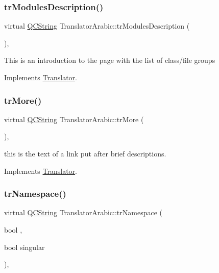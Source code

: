 \subsubsection{\texorpdfstring{trModulesDescription()}{trModulesDescription()}}
{\footnotesize\ttfamily virtual \mbox{\hyperlink{class_q_c_string}{Q\+C\+String}} Translator\+Arabic\+::tr\+Modules\+Description (\begin{DoxyParamCaption}{ }\end{DoxyParamCaption})\hspace{0.3cm}{\ttfamily [inline]}, {\ttfamily [virtual]}}

This is an introduction to the page with the list of class/file groups 

Implements \mbox{\hyperlink{class_translator}{Translator}}.

\mbox{\label{class_translator_arabic_a1ab7653f64d34232057844b8a5eed13d}} 
\subsubsection{\texorpdfstring{trMore()}{trMore()}}
{\footnotesize\ttfamily virtual \mbox{\hyperlink{class_q_c_string}{Q\+C\+String}} Translator\+Arabic\+::tr\+More (\begin{DoxyParamCaption}{ }\end{DoxyParamCaption})\hspace{0.3cm}{\ttfamily [inline]}, {\ttfamily [virtual]}}

this is the text of a link put after brief descriptions. 

Implements \mbox{\hyperlink{class_translator}{Translator}}.

\mbox{\label{class_translator_arabic_a1f3b25edf7d4e0bb62949b2c23bf6bbe}} 
\subsubsection{\texorpdfstring{trNamespace()}{trNamespace()}}
{\footnotesize\ttfamily virtual \mbox{\hyperlink{class_q_c_string}{Q\+C\+String}} Translator\+Arabic\+::tr\+Namespace (\begin{DoxyParamCaption}\item[{bool}]{,  }\item[{bool}]{singular }\end{DoxyParamCaption})\hspace{0.3cm}{\ttfamily [inline]}, {\ttfamily [virtual]}}

